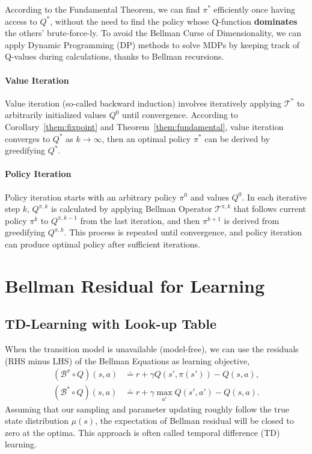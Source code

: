 \documentclass{article} %
\begin{document}
According to the Fundamental Theorem, we can find $\pi^*$ efficiently once having access to $Q^*$, without the need to find the policy whose Q-function \textbf{dominates} the others' brute-force-ly. To avoid the Bellman Curse of Dimensionality, we can apply Dynamic Programming (DP) methods to solve MDPs by keeping track of Q-values during calculations, thanks to Bellman recursions.

\paragraph{Value Iteration} Value iteration (so-called backward induction) involves iteratively applying $\mathcal{T}^*$ to arbitrarily initialized values $Q^0$ until convergence. According to Corollary~\ref{them:fixpoint} and Theorem~\ref{them:fundamental}, value iteration converges to $Q^*$ as $k \to \infty$, then an optimal policy $\pi^*$ can be derived by greedifying $Q^*$.

\paragraph{Policy Iteration} Policy iteration starts with an arbitrary policy $\pi^0$ and values $Q^0$. In each iterative step $k$, $Q^{\pi, k}$ is calculated by applying Bellman Operator $\mathcal{T}^{\pi, k}$ that follows current policy ${\pi^k}$ to $Q^{\pi, {k-1}}$ from the last iteration, and then $\pi^{k+1}$ is derived from greedifying $Q^{\pi, k}$. This process is repeated until convergence, and policy iteration can produce optimal policy after sufficient iterations.
 

\section{Bellman Residual for Learning}

\subsection{TD-Learning with Look-up Table}

When the transition model is unavailable (model-free), we can use the residuals (RHS minus LHS) of the Bellman Equations as learning objective,
\begin{equation}
\begin{aligned}
	(\mathcal{B}^\pi\circ Q) (s,a) &\doteq  r + \gamma Q(s', \pi(s')) - Q(s, a),\\
	(\mathcal{B}^*\circ Q) (s,a) &\doteq  r + \gamma \max_{a'} Q(s', a') - Q(s, a).
\end{aligned}
\end{equation}
Assuming that our sampling and parameter updating roughly follow the true state distribution $\mu(s)$, the expectation of Bellman residual will be closed to zero at the optima. This approach is often called temporal difference (TD) learning. 
\end{document}
